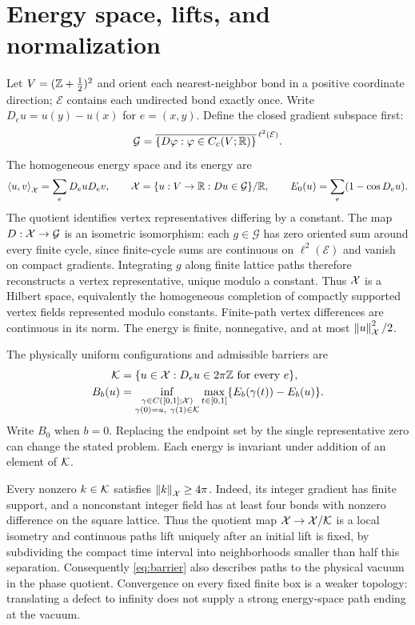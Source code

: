 \section{Energy space, lifts, and normalization}\label{sec:model}

Let $V=(\mathbb Z+\tfrac12)^2$ and orient each nearest-neighbor bond in a positive coordinate direction; $\mathcal E$ contains each undirected bond exactly once. Write $D_eu=u(y)-u(x)$ for $e=(x,y)$. Define the closed gradient subspace first:
\[
 \mathcal G=\overline{\{D\varphi:\varphi\in C_c(V;\mathbb R)\}}^{\,\ell^2(\mathcal E)}.
\]
The homogeneous energy space and its energy are
\begin{equation}\label{eq:energy-space}
 \left\langle u,v\right\rangle_\mathcal X=\sum_e D_euD_ev,\qquad
 \mathcal X=\{u:V\to\mathbb R:Du\in\mathcal G\}/\mathbb R,
 \qquad E_0(u)=\sum_e(1-\cos D_eu).
\end{equation}
The quotient identifies vertex representatives differing by a constant.
The map $D:\mathcal X\to\mathcal G$ is an isometric isomorphism: each
$g\in\mathcal G$ has zero oriented sum around every finite cycle, since
finite-cycle sums are continuous on $\ell^2(\mathcal E)$ and vanish on
compact gradients. Integrating $g$ along finite lattice paths therefore
reconstructs a vertex representative, unique modulo a constant.
Thus $\mathcal X$ is a Hilbert space, equivalently the homogeneous completion of
compactly supported vertex fields represented modulo constants. Finite-path
vertex differences are continuous in its norm. The energy is finite,
nonnegative, and at most $\left\lVert u\right\rVert_\mathcal X^2/2$.

The physically uniform configurations and admissible barriers are
\begin{align}
 \mathcal K&=\{u\in\mathcal X:D_eu\in2\pi\mathbb Z\text{ for every }e\},\label{eq:vacua}\\
 B_b(u)&=\inf_{\substack{\gamma\in C([0,1];\mathcal X)\\
                 \gamma(0)=u,\ \gamma(1)\in\mathcal K}}
     \max_{t\in[0,1]}\{E_b(\gamma(t))-E_b(u)\}.\label{eq:barrier}
\end{align}
Write $B_0$ when $b=0$. Replacing the endpoint set by the single representative zero can change the stated problem. Each energy is invariant under addition of an element of $\mathcal K$.

Every nonzero $k\in\mathcal K$ satisfies $\left\lVert k\right\rVert_\mathcal X\ge4\pi$. Indeed, its integer gradient has finite support, and a nonconstant integer field has at least four bonds with nonzero difference on the square lattice. Thus the quotient map $\mathcal X\to\mathcal X/\mathcal K$ is a local isometry and continuous paths lift uniquely after an initial lift is fixed, by subdividing the compact time interval into neighborhoods smaller than half this separation. Consequently \cref{eq:barrier} also describes paths to the physical vacuum in the phase quotient. Convergence on every fixed finite box is a weaker topology: translating a defect to infinity does not supply a strong energy-space path ending at the vacuum.

